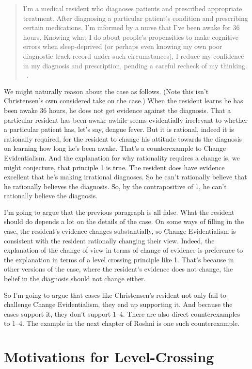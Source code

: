 \begin{quote}
I'm a medical resident who diagnoses patients and prescribed appropriate treatment. After diagnosing a particular patient's condition and prescribing certain medications, I'm informed by a nurse that I've been awake for 36 hours. Knowing what I do about people's propensities to make cognitive errors when sleep-deprived (or perhaps even knowing my own poor diagnostic track-record under such circumstances), I reduce my confidence in my diagnosis and prescription, pending a careful recheck of my thinking. ~\citep[186]{Christensen2010a}.
\end{quote}
We might naturally reason about the case as follows. (Note this isn't Christensen's own considered take on the case.) When the resident learns he has been awake 36 hours, he does not get evidence against the diagnosis. That a particular resident has been awake awhile seems evidentially irrelevant to whether a particular patient has, let's say, dengue fever. But it is rational, indeed it is rationally required, for the resident to change his attitude towards the diagnosis on learning how long he's been awake. That's a counterexample to Change Evidentialism. And the explanation for why rationality requires a change is, we might conjecture, that principle 1 is true. The resident does have evidence excellent that he's making irrational diagnoses. So he can't rationally believe that he rationally believes the diagnosis. So, by the contrapositive of 1, he can't rationally believe the diagnosis.

I'm going to argue that the previous paragraph is all false. What the resident should do depends a lot on the details of the case. On some ways of filling in the case, the resident's evidence changes substantially, so Change Evidentialism is consistent with the resident rationally changing their view. Indeed, the explanation of the change of view in terms of change of evidence is preference to the explanation in terms of a level crossing principle like 1. That's because in other versions of the case, where the resident's evidence does not change, the belief in the diagnosis should not change either.

So I'm going to argue that cases like Christensen's resident not only fail to challenge Change Evidentialism, they end up supporting it. And because the cases support it, they don't support 1--4. There are also direct counterexamples to 1--4. The example in the next chapter of \gls{Roshni} is one such counterexample.

\section{Motivations for Level-Crossing}
\label{motivationsforlevel-crossing}

